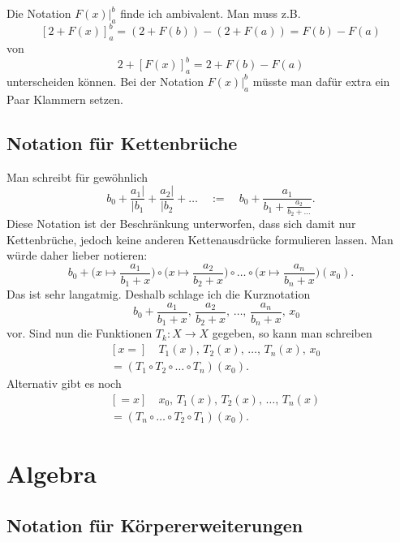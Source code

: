 \documentclass[a4paper,11pt,fleqn]{article}
\begin{document}
Die Notation $F(x)|_a^b$ finde ich ambivalent. Man muss z.B.
\[[2+F(x)]_a^b = (2+F(b))-(2+F(a)) = F(b)-F(a)\]
von
\[2+[F(x)]_a^b = 2+F(b)-F(a)\]
unterscheiden können. Bei der Notation $F(x)|_a^b$ müsste
man dafür extra ein Paar Klammern setzen.

\subsection{Notation für Kettenbrüche}
Man schreibt für gewöhnlich
\begin{equation}
b_0 + \frac{a_1|}{|b_1} + \frac{a_2|}{|b_2} + \ldots
\quad:=\quad b_0+\frac{a_1}{b_1+\frac{a_2}{b_2+\ldots}}.
\end{equation}
Diese Notation ist der Beschränkung unterworfen, dass sich damit
nur Kettenbrüche, jedoch keine anderen Kettenausdrücke formulieren
lassen. Man würde daher lieber notieren:
\begin{equation}
b_0+\Big(x\mapsto\frac{a_1}{b_1+x}\Big)
\circ\Big(x\mapsto\frac{a_2}{b_2+x}\Big)
\circ\ldots\circ\Big(x\mapsto\frac{a_n}{b_n+x}\Big)(x_0).
\end{equation}
Das ist sehr langatmig. Deshalb schlage ich die Kurznotation
\begin{equation}
[x{=}]\quad b_0+\frac{a_1}{b_1+x},\,\frac{a_2}{b_2+x},\,\ldots,\,
\frac{a_n}{b_n+x},\,x_0
\end{equation}
vor. Sind nun die Funktionen $T_k\colon X\to X$ gegeben, so
kann man schreiben
\begin{equation}
\begin{split}
& [x{=}]\quad T_1(x),\,T_2(x),\,\ldots,\,T_n(x),\,x_0\\
&= (T_1\circ T_2\circ\ldots\circ T_n)(x_0).
\end{split}
\end{equation}
Alternativ gibt es noch
\begin{equation}
\begin{split}
& [{=}x]\quad x_0,\, T_1(x),\, T_2(x),\,\ldots,\, T_n(x)\\
&= (T_n\circ\ldots\circ T_2\circ T_1)(x_0).
\end{split}
\end{equation}


\section{Algebra}
\subsection{Notation für Körpererweiterungen}
\end{document}

